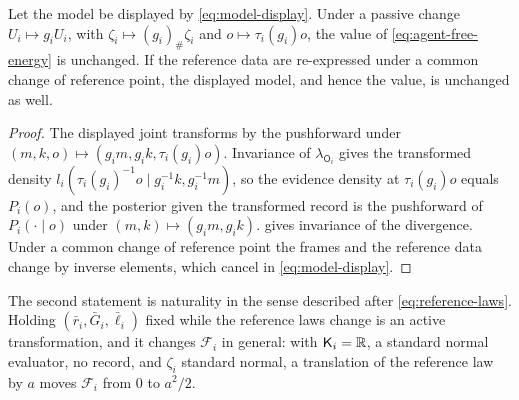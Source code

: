 Let the model be displayed by \cref{eq:model-display}. Under a passive change $U_i\mapsto g_iU_i$, with $\zeta_i\mapsto(g_i)_\#\zeta_i$ and $o\mapsto\tau_i(g_i)o$, the value of \cref{eq:agent-free-energy} is unchanged. If the reference data are re-expressed under a common change of reference point, the displayed model, and hence the value, is unchanged as well.
\begin{proof}
The displayed joint transforms by the pushforward under $(m,k,o)\mapsto(g_im,g_ik,\tau_i(g_i)o)$. Invariance of $\lambda_{\mathsf O_i}$ gives the transformed density $l_i(\tau_i(g_i)^{-1}o\mid g_i^{-1}k,g_i^{-1}m)$, so the evidence density at $\tau_i(g_i)o$ equals $P_i(o)$, and the posterior given the transformed record is the pushforward of $P_i(\cdot\mid o)$ under $(m,k)\mapsto(g_im,g_ik)$.  gives invariance of the divergence. Under a common change of reference point the frames and the reference data change by inverse elements, which cancel in \cref{eq:model-display}.
\end{proof}
The second statement is naturality in the sense described after \cref{eq:reference-laws}. Holding $(\bar r_i,\bar G_i,\bar\ell_i)$ fixed while the reference laws change is an active transformation, and it changes $\mathcal F_i$ in general: with $\mathsf K_i=\mathbb R$, a standard normal evaluator, no record, and $\zeta_i$ standard normal, a translation of the reference law by $a$ moves $\mathcal F_i$ from $0$ to $a^2/2$.

